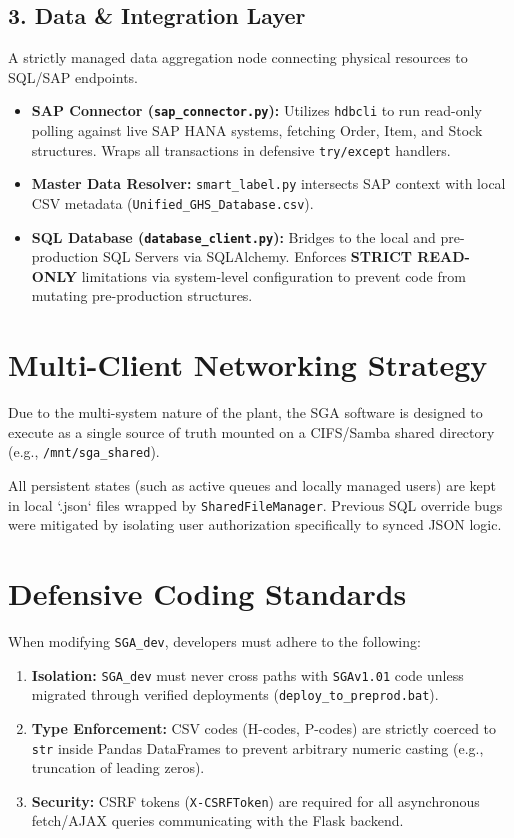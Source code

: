 \documentclass[12pt, a4paper]{article}
\begin{document}
\subsection{3. Data \& Integration Layer}
A strictly managed data aggregation node connecting physical resources to SQL/SAP endpoints.
\begin{itemize}
    \item \textbf{SAP Connector (\texttt{sap\_connector.py}):} Utilizes \texttt{hdbcli} to run read-only polling against live SAP HANA systems, fetching Order, Item, and Stock structures. Wraps all transactions in defensive \texttt{try/except} handlers.
    \item \textbf{Master Data Resolver:} \texttt{smart\_label.py} intersects SAP context with local CSV metadata (\texttt{Unified\_GHS\_Database.csv}).
    \item \textbf{SQL Database (\texttt{database\_client.py}):} Bridges to the local and pre-production SQL Servers via SQLAlchemy. Enforces \textbf{STRICT READ-ONLY} limitations via system-level configuration to prevent code from mutating pre-production structures.
\end{itemize}

\section{Multi-Client Networking Strategy}
Due to the multi-system nature of the plant, the SGA software is designed to execute as a single source of truth mounted on a CIFS/Samba shared directory (e.g., \texttt{/mnt/sga\_shared}).

\begin{tcolorbox}[colback=red!5!white,colframe=red!75!black,title=Critical Constraint: State Locking]
All persistent states (such as active queues and locally managed users) are kept in local `.json` files wrapped by \texttt{SharedFileManager}. Previous SQL override bugs were mitigated by isolating user authorization specifically to synced JSON logic.
\end{tcolorbox}

\section{Defensive Coding Standards}
When modifying \texttt{SGA\_dev}, developers must adhere to the following:
\begin{enumerate}[label=\textbf{\arabic*.}]
    \item \textbf{Isolation:} \texttt{SGA\_dev} must never cross paths with \texttt{SGAv1.01} code unless migrated through verified deployments (\texttt{deploy\_to\_preprod.bat}).
    \item \textbf{Type Enforcement:} CSV codes (H-codes, P-codes) are strictly coerced to \texttt{str} inside Pandas DataFrames to prevent arbitrary numeric casting (e.g., truncation of leading zeros).
    \item \textbf{Security:} CSRF tokens (\texttt{X-CSRFToken}) are required for all asynchronous fetch/AJAX queries communicating with the Flask backend.
\end{enumerate}
\end{document}
